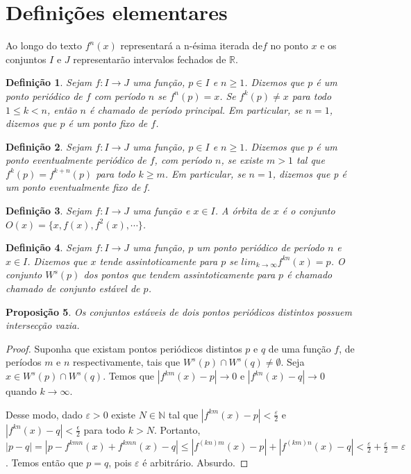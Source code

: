 \documentclass[a4paper, 12pt]{article}
\newtheorem{definition}{Definição}[section]
\newtheorem{proposition}[definition]{Proposição}
\newcommand{\RR}{\mathbb{R}}
\newcommand{\NN}{\mathbb{N}}
\begin{document}
\section{Definições elementares}

Ao longo do texto $f^n(x)$ representará a n-ésima iterada de$f$ no ponto $x$ e os conjuntos $I$ e $J$ representarão intervalos fechados de $\RR$. 
 
\begin{definition}
Sejam $f: I \rightarrow J$ uma função, $p \in I$ e $n \geq 1$.  Dizemos que $p$ é um ponto periódico de $f$ com período $n$ se $f^n(p) = x$. Se $f^k(p) \neq x$ para todo $1 \leq k < n$, então $n$ é chamado de período principal. Em particular, se $n=1$, dizemos que $p$ é um ponto fixo de $f$.
\end{definition}

\begin{definition}
Sejam $f: I \rightarrow J$ uma função, $p \in I$ e $n \geq 1$. Dizemos que $p$ é um ponto eventualmente periódico de $f$, com período $n$, se existe $m > 1$ tal que $f^k(p) = f^{k+n}(p)$ para todo $k \geq m$. Em particular, se $n = 1$, dizemos que p é um ponto eventualmente fixo de f.
\end{definition}

\begin{definition}
Sejam $f:I \rightarrow J$ uma função e $x \in I$. A órbita de $x$ é o conjunto $O(x) = \lbrace x, f(x), f^2(x), \cdots \rbrace$.
\end{definition}

\begin{definition}
Sejam $f: I \rightarrow J$ uma função, $p$ um ponto periódico de período $n$ e $x \in I$. Dizemos que $x$ tende assintoticamente para $p$ se $lim_{k \rightarrow \infty} f^{kn}(x) = p$. O conjunto $W^s(p)$ dos pontos que tendem assintoticamente para $p$ é chamado chamado de conjunto estável de $p$.
\end{definition}

\begin{proposition}
Os conjuntos estáveis de dois pontos periódicos distintos possuem intersecção vazia.
\end{proposition}

\begin{proof}
Suponha que existam pontos periódicos distintos $p$ e $q$ de uma função $f$, de períodos $m$ e $n$ respectivamente, tais que $W^s(p) \cap W^s(q) \neq \emptyset$. Seja $x \in W^s(p) \cap W^s(q)$. Temos que $|f^{km}(x) - p| \rightarrow 0$ e $|f^{kn}(x) - q| \rightarrow 0$ quando $k \rightarrow \infty$.

Desse modo, dado $\varepsilon > 0$ existe $N \in \NN$ tal que $|f^{km}(x) - p| < \frac{\varepsilon}{2}$ e $|f^{kn}(x) - q| < \frac{\epsilon}{2}$ para todo $k > N$. Portanto, $|p - q| = |p - f^{kmn}(x) + f^{kmn}(x) - q| \leq |f^{(kn)m}(x) - p| + |f^{(km)n}(x) - q| < \frac{\varepsilon}{2} + \frac{\varepsilon}{2} = \varepsilon$. Temos então que $p = q$, pois $\varepsilon$ é arbitrário. Absurdo.
\end{proof}
\end{document}
